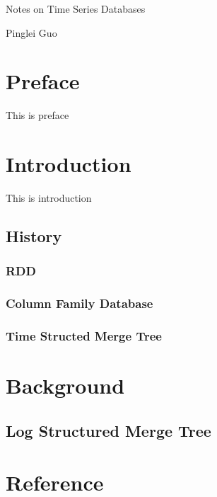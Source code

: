 \documentclass[12pt,a4paper,oneside]{book}
\author{Pinglei Guo}
\date{\today}
\begin{document}
\centerline{\Large{Notes on Time Series Databases}}
\centerline{Pinglei Guo}
\clearpage

\chapter*{Preface}

This is preface

\tableofcontents
\clearpage

\chapter{Introduction}

This is introduction

\section{History}

\subsection{RDD}

\subsection{Column Family Database}

\subsection{Time Structed Merge Tree}

\chapter{Background}

\section{Log Structured Merge Tree}


\clearpage

\chapter*{Reference}
\printbibliography
\end{document}

